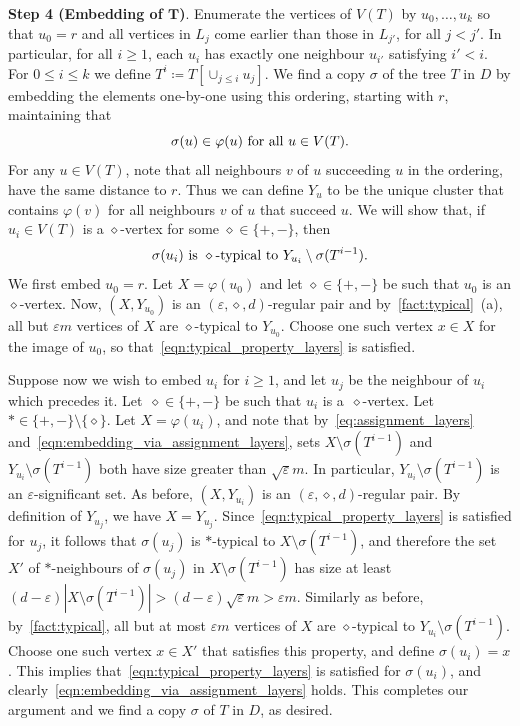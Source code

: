 \documentclass[11pt]{article}
\numberwithin{equation}{section}
\renewcommand{\geq}{\geqslant}
\renewcommand{\leq}{\leqslant}
\let\eps=\varepsilon
\let\phi=\varphi
\theoremstyle{definition}
\def\eps{{\varepsilon}}
\begin{document}
\textbf{Step 4 (Embedding of $\boldsymbol{T}$)}.
Enumerate the vertices of $V(T)$ by $u_0,\dots,u_{k}$ so that $u_0 = r$ and all vertices in $L_j$ come earlier than those in $L_{j'}$, for all $j<j'$. In particular, for all $i\geq 1$, each $u_i$ has exactly one neighbour $u_{i'}$ satisfying $i'<i$. For $0\leq i \leq k$ we define $T^i \coloneqq T[\cup_{j\leq i}u_j]$. We find a copy $\sigma$ of the tree $T$ in $D$ by embedding the elements one-by-one using this ordering, starting with $r$, maintaining that
\begin{equation}\label{eqn:embedding_via_assignment_layers}
    \sigma(u) \in \phi(u) \textnormal{ for all } u \in V(T).
\end{equation}
For any $u\in V(T)$, note that all neighbours $v$ of $u$ succeeding $u$ in the ordering, have the same distance to $r$. Thus we can define $Y_u$ to be the unique cluster that contains $\phi(v)$ for all neighbours $v$ of $u$ that succeed $u$. We will show that, if $u_i\in V(T)$ is a $\diamond$-vertex for some $\diamond\in \{+,-\}$, then 
\begin{equation}\label{eqn:typical_property_layers}
     \sigma(u_i) \textnormal{ is } \diamond\textnormal{-typical to } Y_{u_i}\setminus \sigma(T^{i-1}).
\end{equation}
We first embed $u_0=r$. Let $X = \phi(u_0)$ and let $\diamond \in \{+,-\}$ be such that $u_0$ is an $\diamond$-vertex. Now, $(X,Y_{u_0})$ is an $(\eps,\diamond,d)$-regular pair and by~\cref{fact:typical}~(a), all but $\eps m$ vertices of $X$ are $\diamond$-typical to $Y_{u_0}$. Choose one such vertex $x\in X$ for the image of $u_0$, so that~\eqref{eqn:typical_property_layers} is satisfied.


Suppose now we wish to embed $u_i$ for $i\geq 1$, and let $u_j$ be the neighbour of $u_i$ which precedes it. Let~$\diamond\in \{+,-\}$ be such that $u_i$ is a~$\diamond$-vertex. Let~$\ast\in \{+,-\} \setminus \{\diamond\}$. Let $X = \phi(u_i)$, and note that by~\eqref{eq:assignment_layers} and~\eqref{eqn:embedding_via_assignment_layers},  sets $X\setminus \sigma(T^{i-1})$ and $Y_{u_i} \setminus \sigma(T^{i-1})$ both have size greater than $\sqrt{\eps}m$. In particular, $Y_{u_i}\setminus \sigma(T^{i-1})$ is an $\eps$-significant set. As before, $(X,Y_{u_i})$ is an $(\eps,\diamond,d)$-regular pair.
%
By definition of $Y_{u_j}$, we have $X  = Y_{u_j}$.
Since~\eqref{eqn:typical_property_layers} is satisfied for $u_j$, it follows that $\sigma(u_j)$ is $\ast$-typical to $X\setminus \sigma(T^{i-1})$, and therefore the set $X'$ of $\ast$-neighbours of $\sigma(u_j)$ in $X\setminus \sigma(T^{i-1})$ has size at least $(d-\eps)|X\setminus \sigma(T^{i-1})| > (d-\eps)\sqrt{\eps}m>\eps m$.
Similarly as before, by~\cref{fact:typical}, all but at most $\eps m$ vertices of $X$ are $\diamond$-typical to $Y_{u_i}\setminus  \sigma(T^{i-1})$. Choose one such vertex $x\in X'$ that satisfies this property, and define $\sigma(u_i) = x$. This implies that~\eqref{eqn:typical_property_layers} is satisfied for $\sigma(u_i)$, and clearly~\eqref{eqn:embedding_via_assignment_layers} holds. This completes our argument and we find a copy $\sigma$ of $T$ in $D$, as desired.
%
\end{document}
